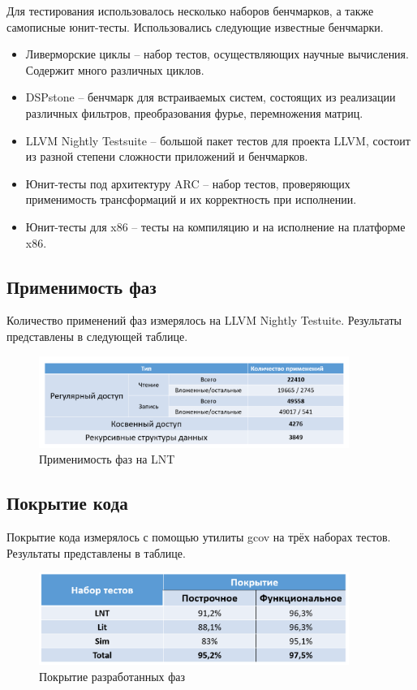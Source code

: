 \documentclass[12pt,a4paper,oneside]{article}
\begin{document}
Для тестирования использовалось несколько наборов бенчмарков, а также самописные юнит-тесты. Использовались следующие известные бенчмарки.
\begin{itemize}
\item Ливерморские циклы\cite{Liver} -- набор тестов, осуществляющих научные вычисления. Содержит много различных циклов.
\item DSPstone\cite{DSP} -- бенчмарк для встраиваемых систем, состоящих из реализации различных фильтров, преобразования фурье, перемножения матриц.
\item LLVM Nightly Testsuite\cite{LNT} -- большой пакет тестов для проекта LLVM, состоит из разной степени сложности приложений и бенчмарков.
\item Юнит-тесты под архитектуру ARC -- набор тестов, проверяющих применимость трансформаций и их корректность при исполнении.
\item Юнит-тесты для x86 -- тесты на компиляцию и на исполнение на платформе x86.
\end{itemize}

\pagebreak

\subsection{Применимость фаз}

Количество применений фаз измерялось на LLVM Nightly Testuite. Результаты представлены в следующей таблице.

\begin{figure}[h!]
  \centering
  \includegraphics[width=0.9\textwidth]{table_01.PNG}
  \caption{Применимость фаз на LNT}
\end{figure}


\subsection{Покрытие кода}

Покрытие кода измерялось с помощью утилиты gcov на трёх наборах тестов. Результаты представлены в таблице.

\begin{figure}[h!]
  \centering
  \includegraphics[width=0.9\textwidth]{coverage.PNG}
  \caption{Покрытие разработанных фаз}
\end{figure}
\end{document}
